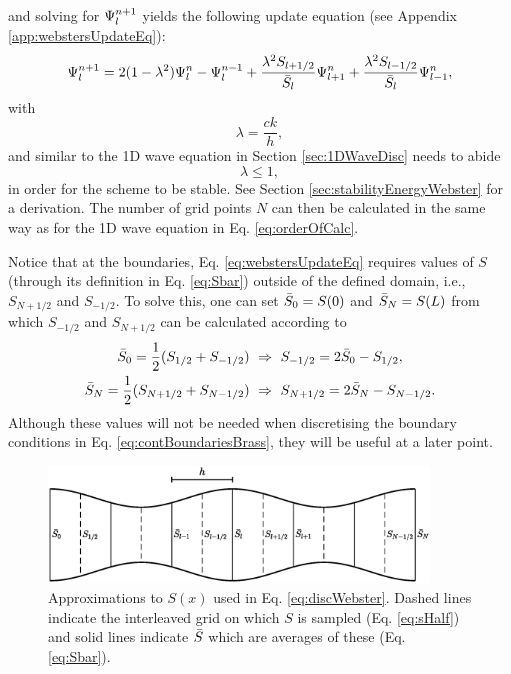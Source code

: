 and solving for $\Psi_l^{n+1}$ yields the following update equation (see Appendix \ref{app:webstersUpdateEq}):
\begin{equation}
    \Psi_l^{n+1} = 2(1-\lambda^2)\Psi_l^n-\Psi_l^{n-1}+ \frac{\lambda^2S_{l+1/2}}{\bar{S}_l}\Psi_{l+1}^n + \frac{\lambda^2S_{l-1/2}}{\bar{S}_l}\Psi_{l-1}^n,\label{eq:webstersUpdateEq}
\end{equation}
with 
\begin{equation}
    \lambda = \frac{ck}{h},
\end{equation}
and similar to the 1D wave equation in Section \ref{sec:1DWaveDisc} needs to abide
\begin{equation}\label{eq:CFLwebster}
    \lambda \leq 1,
\end{equation}
in order for the scheme to be stable. See Section \ref{sec:stabilityEnergyWebster} for a derivation. The number of grid points $N$ can then be calculated in the same way as for the 1D wave equation in Eq. \eqref{eq:orderOfCalc}.

Notice that at the boundaries, Eq. \eqref{eq:webstersUpdateEq} requires values of $S$ (through its definition in Eq. \eqref{eq:Sbar}) outside of the defined domain, i.e., $S_{N+1/2}$ and $S_{-1/2}$. To solve this, one can set $\bar{S}_0 = S(0)$ and $\bar{S}_N = S(L)$ from which $S_{-1/2}$ and $S_{N+1/2}$ can be calculated according to
\begin{subequations}
    \begin{align}
        \Sbar_0 = \frac{1}{2}(S_{1/2} + S_{-1/2}) \ &\Rightarrow \ S_{-1/2} = 2\Sbar_0 - S_{1/2},\\
        \Sbar_N = \frac{1}{2}(S_{N+1/2} + S_{N-1/2}) \ &\Rightarrow \ S_{N+1/2} = 2\Sbar_N - S_{N-1/2}.\label{eq:Snph}
    \end{align} 
\end{subequations}
Although these values will not be needed when discretising the boundary conditions in Eq. \eqref{eq:contBoundariesBrass}, they will be useful at a later point.

\begin{figure}[t]
    \centering
    \includegraphics[width=0.9\textwidth]{figures/resonators/brass/variableCrossSection.eps}
    \caption{Approximations to $S(x)$ used in Eq. \eqref{eq:discWebster}. Dashed lines indicate the interleaved grid on which $S$ is sampled (Eq. \eqref{eq:sHalf}) and solid lines indicate $\bar{S}$ which are averages of these (Eq. \eqref{eq:Sbar}). \label{fig:variableCrossSection}}
\end{figure}


